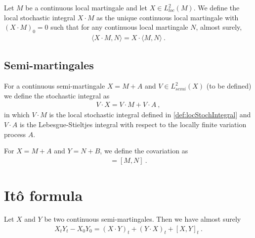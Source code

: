 \begin{definition}\label{def:locStochIntegral}
Let $M$ be a continuous local martingale and let $X \in L^2_{loc}(M)$.
We define the local stochastic integral $X \cdot M$ as the unique continuous local martingale with $(X \cdot M)_0 = 0$ such that for any continuous local martingale $N$, almost surely,
\begin{align*}
  \langle X \cdot M, N \rangle = X \cdot \langle M, N \rangle
  \: .
\end{align*}
\end{definition}


\subsection{Semi-martingales}

\begin{definition}\label{def:stochIntegral}
For a continuous semi-martingale $X = M + A$ and $V \in L^2_{semi}(X)$ (to be defined) we define the stochastic integral as
\begin{align*}
  V \cdot X = V \cdot M + V \cdot A
  \: ,
\end{align*}
in which $V \cdot M$ is the local stochastic integral defined in \ref{def:locStochIntegral} and $V \cdot A$ is the Lebesgue-Stieltjes integral with respect to the locally finite variation process $A$.
\end{definition}


For $X = M + A$ and $Y = N + B$, we define the covariation as
\begin{align*}
  [X, Y] = [M, N]
  \: .
\end{align*}

\section{Itô formula}


\begin{theorem}\label{thm:integration_by_parts}
Let $X$ and $Y$ be two continuous semi-martingales. Then we have almost surely
\begin{align*}
  X_t Y_t - X_0 Y_0
  = (X \cdot Y)_t + (Y \cdot X)_t + [X,Y]_t
  \: .
\end{align*}
\end{theorem}

